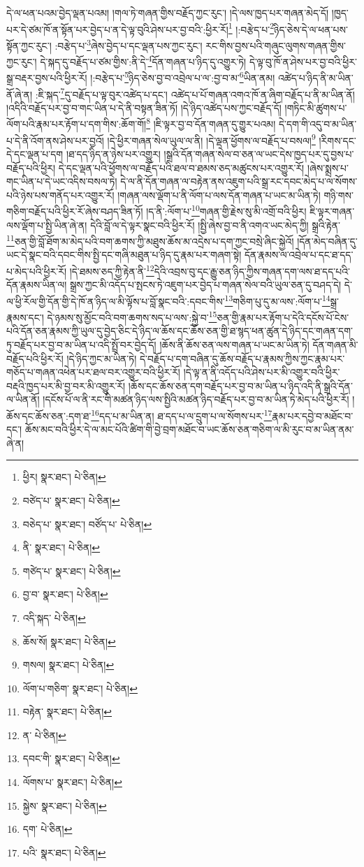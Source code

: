 དེ་ལ་ཕན་པའམ་བྱེད་ལྡན་པའམ། །གལ་ཏེ་གཞན་གྱིས་བརྗོད་ཀྱང་རུང་། །དེ་ལས་ཁྱད་པར་གཞན་མེད་དོ། །ཁྱད་པར་དེ་ཙམ་ཁོ་ན་སྟོན་པར་བྱེད་པ་ན་དེ་ལྟ་བུའི་ཤེས་པར་བྱ་བའི་:ཕྱིར་རོ།\footnote{ཕྱིར།  སྣར་ཐང་།  པེ་ཅིན། } །:བརྩེད་པ་\footnote{བཙེད་པ་  སྣར་ཐང་།  པེ་ཅིན། }ཉིད་ཅེས་དེ་ལ་ཕན་པས་སྟོན་ཀྱང་རུང་། :བརྩེད་པ་\footnote{བཅེད་པ་  སྣར་ཐང་། བཙོད་པ་  པེ་ཅིན། }ཞེས་བྱེད་པ་དང་ལྡན་པས་ཀྱང་རུང་། རང་གིས་བྱས་པའི་གཞུང་ལུགས་གཞན་གྱིས་ཀྱང་རུང་། དེ་སྐད་དུ་བརྗོད་པ་ཙམ་གྱིས་:ནི་དེ་\footnote{ནི་  སྣར་ཐང་།  པེ་ཅིན། }དོན་གཞན་པ་ཉིད་དུ་འགྱུར་ཏེ། དེ་ལྟ་བུ་ཁོ་ན་ཤེས་པར་བྱ་བའི་ཕྱིར་སྒྲ་བརྡར་བྱས་པའི་ཕྱིར་རོ། །:བརྩེད་པ་\footnote{གཙེད་པ་  སྣར་ཐང་།  པེ་ཅིན། }ཉིད་ཅེས་བྱ་བ་འབྲེལ་པ་ལ་:བྱ་བ་མ་\footnote{བྱ་བ་  སྣར་ཐང་།  པེ་ཅིན། }ཡིན་ནམ། འཚེད་པ་ཉིད་ནི་མ་ཡིན་ནོ་ཞེ་ན། :ཇི་སྐད་\footnote{འདི་སྐད་  པེ་ཅིན། }དུ་བརྗོད་པ་ལྟ་བུར་འཚེད་པ་དང་། འཚེད་པ་པོ་གཞན་འགའ་ཁོ་ན་ཞིག་བརྗོད་པ་ནི་མ་ཡིན་ནོ། །འདིའི་བརྗོད་པར་བྱ་བ་གང་ཡིན་པ་དེ་ནི་བསྟན་ཟིན་ཏོ། །དེ་ཉིད་འཚེད་པས་ཀྱང་བརྗོད་དོ། །གཏིང་མི་ཚུགས་པ་ལོག་པའི་རྣམ་པར་རྟོག་པ་དག་གིས་:ཆོག་གོ།\footnote{ཆོས་སོ།  སྣར་ཐང་།  པེ་ཅིན། } །ཇི་ལྟར་བྱ་བ་དོན་གཞན་དུ་གྱུར་པའམ། དེ་དག་གི་འདུ་བ་མ་ཡིན་པ་དེ་ནི་འོག་ནས་ཤེས་པར་བྱའོ། །དེ་ཕྱིར་གཞན་སེལ་ཡུལ་ལ་ནི། །དེ་ལྡན་ཕྱོགས་ལ་བརྗོད་པ་བསལ།\footnote{གསལ།  སྣར་ཐང་།  པེ་ཅིན། } །རིགས་དང་དེ་དང་ལྡན་པ་དག །ཐ་དད་ཉིད་ན་ཉེས་པར་འགྱུར། །སྒྲའི་དོན་གཞན་སེལ་བ་ཅན་ལ་ཡང་དེས་ཁྱད་པར་དུ་བྱས་པ་བརྗོད་པའི་ཕྱིར། དེ་དང་ལྡན་པའི་ཕྱོགས་ལ་བརྗོད་པའི་ཐལ་བ་ཐམས་ཅད་མཚུངས་པར་འགྱུར་རོ། །ཞེས་སྨྲས་པ་གང་ཡིན་པ་དེ་ཡང་འདིས་བསལ་ཏེ། དེ་ལ་ནི་དོན་གཞན་ལ་བརྟེན་ནས་འཇུག་པའི་སྒྲ་རང་དབང་མེད་པ་ལ་སོགས་པའི་ཉེས་པས་གནོད་པར་འགྱུར་རོ། །གཞན་ལས་ལྡོག་པ་ནི་ལོག་པ་ལས་དོན་གཞན་པ་ཡང་མ་ཡིན་ཏེ། གཉི་གས་གཅིག་བརྗོད་པའི་ཕྱིར་རོ་ཞེས་བཤད་ཟིན་ཏོ། །ད་ནི་:ལོག་པ་\footnote{ལོག་པ་གཅིག་  སྣར་ཐང་།  པེ་ཅིན། }གཞན་གྱི་རྗེས་སུ་མི་འགྲོ་བའི་ཕྱིར། ཇི་ལྟར་གཞན་ལས་ལྡོག་པ་སྤྱི་ཡིན་ཞེ་ན། དེའི་བློ་ལ་དེ་ལྟར་སྣང་བའི་ཕྱིར་རོ། །སྤྱི་ཞེས་བྱ་བ་ནི་འགའ་ཡང་མེད་ཀྱི། སྒྲའི་རྟེན་\footnote{བརྟེན་  སྣར་ཐང་།  པེ་ཅིན། }ཅན་གྱི་བློ་ཐོག་མ་མེད་པའི་བག་ཆགས་ཀྱི་མཐུས་ཆོས་མ་འདྲེས་པ་དག་ཀྱང་བསྲེ་ཞིང་སྐྱེའོ། །དོན་མེད་བཞིན་དུ་ཡང་དེ་སྣང་བའི་དབང་གིས་སྤྱི་དང་གཞི་མཐུན་པ་ཉིད་དུ་རྣམ་པར་གཞག་སྟེ། དོན་རྣམས་ལ་འབྲེལ་པ་དང་ཐ་དད་པ་མེད་པའི་ཕྱིར་རོ། །དེ་ཐམས་ཅད་ཀྱི་རྟེན་ནི་\footnote{ན་  པེ་ཅིན། }དེའི་འབྲས་བུ་དང་རྒྱུ་ཅན་ཉིད་ཀྱིས་གཞན་དག་ལས་ཐ་དད་པའི་དོན་རྣམས་ཡིན་ལ། སྒྲས་ཀྱང་མི་འདོད་པ་སྤངས་ཏེ་འཇུག་པར་བྱེད་པ་གཞན་སེལ་བའི་ཡུལ་ཅན་དུ་བཤད་དེ། དེ་ལ་ཕྱི་རོལ་གྱི་དོན་གྱི་དེ་ཁོ་ན་ཉིད་ལ་མི་ལྟོས་པ་བློ་སྣང་བའི་:དབང་གིས་\footnote{དབང་གི་  སྣར་ཐང་།  པེ་ཅིན། }གཅིག་པུ་དུ་མ་ལས་:ལོག་པ་\footnote{ལོགས་པ་  སྣར་ཐང་།  པེ་ཅིན། }སྒྲ་རྣམས་དང་། དེ་ཉམས་སུ་མྱོང་བའི་བག་ཆགས་སད་པ་ལས་:སྐྱེ་བ་\footnote{སྐྱེས་  སྣར་ཐང་།  པེ་ཅིན། }ཅན་གྱི་རྣམ་པར་རྟོག་པ་དེའི་དངོས་པོ་ངེས་པའི་དོན་ཅན་རྣམས་ཀྱི་ཡུལ་དུ་བྱེད་ཅིང་དེ་ཉིད་ལ་ཆོས་དང་ཆོས་ཅན་གྱི་ཐ་སྙད་ཕན་ཚུན་དེ་ཉིད་དང་གཞན་དག་ཏུ་བརྗོད་པར་བྱ་བ་མ་ཡིན་པ་འདི་སྤྲོ་བར་བྱེད་དོ། །ཆོས་ནི་ཆོས་ཅན་ལས་གཞན་པ་ཡང་མ་ཡིན་ཏེ། དོན་གཞན་མི་བརྗོད་པའི་ཕྱིར་རོ། །དེ་ཉིད་ཀྱང་མ་ཡིན་ཏེ། དེ་བརྗོད་པ་དག་བཞིན་དུ་ཆོས་བརྗོད་པ་རྣམས་ཀྱིས་ཀྱང་རྣམ་པར་གཅོད་པ་གཞན་འཕེན་པར་ཐལ་བར་འགྱུར་བའི་ཕྱིར་རོ། །དེ་ལྟ་ན་ནི་འདོད་པའི་ཤེས་པར་མི་འགྱུར་བའི་ཕྱིར་བརྡའི་ཁྱད་པར་མི་བྱ་བར་མི་འགྱུར་རོ། །ཆོས་དང་ཆོས་ཅན་དག་བརྗོད་པར་བྱ་བ་མ་ཡིན་པ་ཉིད་འདི་ནི་སྒྲའི་དོན་ལ་ཡིན་ནོ། །དངོས་པོ་ལ་ནི་རང་གི་མཚན་ཉིད་ལས་སྤྱིའི་མཚན་ཉིད་བརྗོད་པར་བྱ་བ་མ་ཡིན་ཏེ་མེད་པའི་ཕྱིར་རོ། །ཆོས་དང་ཆོས་ཅན་:དག་ཐ་\footnote{དག་  པེ་ཅིན། }དད་པ་མ་ཡིན་ན། ཐ་དད་པ་ལ་དྲུག་པ་ལ་སོགས་པར་\footnote{པའི་  སྣར་ཐང་།  པེ་ཅིན། }རྣམ་པར་དབྱེ་བ་མཐོང་བ་དང་། ཆོས་མང་བའི་ཕྱིར་དེ་ལ་མང་པོའི་ཚིག་གི་བྱེ་བྲག་མཐོང་བ་ཡང་ཆོས་ཅན་གཅིག་ལ་མི་རུང་བ་མ་ཡིན་ནམ་ཞེ་ན། 